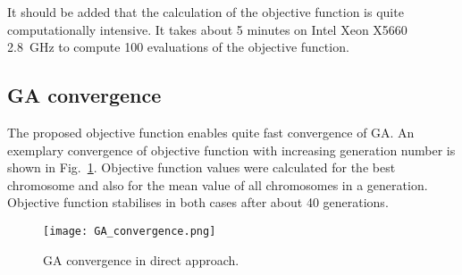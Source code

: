 \documentclass[preprint,12pt]{elsarticle}
\begin{document}
	It should be added that the calculation of the objective function is quite computationally intensive. It takes about 5 minutes on Intel Xeon X5660 2.8~GHz to compute 100 evaluations of the objective function. 
\subsection{GA convergence}
The proposed objective function enables quite fast convergence of GA. An exemplary convergence of objective function with increasing generation number is shown in Fig.~\ref{fig:GAconvergence}. Objective function values were calculated for the best chromosome and also for the mean value of all chromosomes in a generation. Objective function stabilises in both cases after about 40 generations.
	\begin{figure} [h!]
		\centering
		\texttt{[image: GA\_convergence.png]}
		\caption{GA convergence in direct approach.}
		\label{fig:GAconvergence}
	\end{figure}
\end{document}

